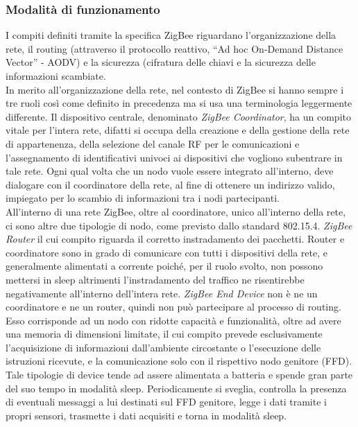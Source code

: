 \subsubsection{Modalità di funzionamento}
I compiti definiti tramite la specifica ZigBee riguardano l'organizzazione della rete, il routing (attraverso il protocollo reattivo, ``Ad hoc On-Demand Distance Vector'' - AODV) e la sicurezza (cifratura delle chiavi e la sicurezza delle informazioni scambiate.\\
In merito all'organizzazione della rete, nel contesto di ZigBee si hanno sempre i tre ruoli così come definito in precedenza ma si usa una terminologia leggermente differente.
Il dispositivo centrale, denominato \textit{ZigBee Coordinator}, ha un compito vitale per l'intera rete, difatti si occupa della creazione e della gestione della rete di appartenenza, della selezione del canale RF per le comunicazioni e l'assegnamento di identificativi univoci ai dispositivi che vogliono subentrare in tale rete. Ogni qual volta che un nodo vuole essere integrato all'interno, deve dialogare con il coordinatore della rete, al fine di ottenere un indirizzo valido, impiegato per lo scambio di informazioni tra i nodi partecipanti.\\
All'interno di una rete ZigBee, oltre al coordinatore, unico all'interno della rete, ci sono altre due tipologie di nodo, come previsto dallo standard 802.15.4. 
\textit{ZigBee Router} il cui compito riguarda il corretto instradamento dei pacchetti. Router e coordinatore sono in grado di comunicare con tutti i dispositivi della rete, e generalmente alimentati a corrente poiché, per il ruolo svolto, non possono mettersi in sleep altrimenti l'instradamento del traffico ne risentirebbe negativamente all'interno dell'intera rete.
\textit{ZigBee End Device} non è ne un coordinatore e ne un router, quindi non può partecipare al processo di routing. Esso corrisponde ad un nodo con ridotte capacità e funzionalità, oltre ad avere una memoria di dimensioni limitate, il cui compito prevede esclusivamente l'acquisizione di informazioni dall'ambiente circostante o l'esecuzione delle istruzioni ricevute, e la comunicazione solo con il rispettivo nodo genitore (FFD). Tale tipologie di device tende ad assere alimentata a batteria e spende gran parte del suo tempo in modalità sleep. Periodicamente si sveglia, controlla la presenza di eventuali messaggi a lui destinati sul FFD genitore, legge i dati tramite i propri sensori, trasmette i dati acquisiti e torna in modalità sleep.\\

